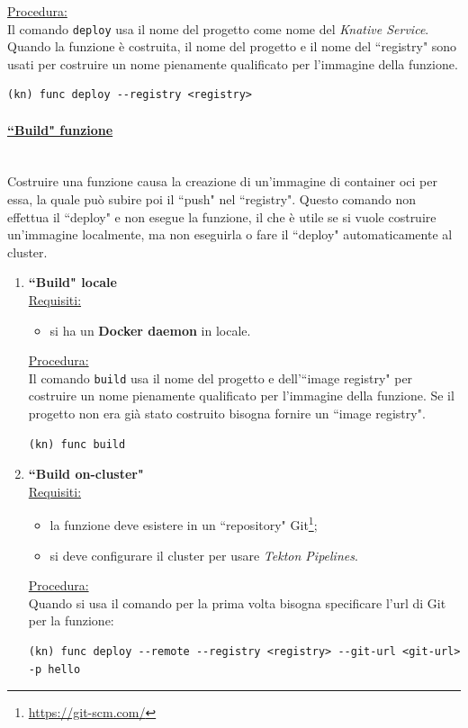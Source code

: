 \documentclass[12pt,a4paper,openany,twoside]{book}
\begin{document}
\noindent
\underline{Procedura:}
\\
Il comando \texttt{deploy} usa il nome del progetto come nome del \textit{Knative Service}. Quando la funzione è costruita, il nome del progetto e il nome del ``registry" sono usati per costruire un nome pienamente qualificato per l'immagine della funzione.
\begin{lstlisting}
(kn) func deploy --registry <registry>\end{lstlisting}


\paragraph{\underline{``Build" funzione}} ~\\
Costruire una funzione causa la creazione di un'immagine di container \ac{oci} per essa, la quale può subire poi il ``push" nel ``registry". Questo comando non effettua il ``deploy" e non esegue la funzione, il che è utile se si vuole costruire un'immagine localmente, ma non eseguirla o fare il ``deploy" automaticamente al cluster.

\begin{enumerate}
    \item \textbf{``Build" locale}
        \\
        \underline{Requisiti:}
        \begin{itemize}
            \item si ha un \textbf{Docker daemon} in locale.
        \end{itemize}

        \underline{Procedura:}
        \\
        Il comando \texttt{build} usa il nome del progetto e dell'``image registry" per costruire un nome pienamente qualificato per l'immagine della funzione. Se il progetto non era già stato costruito bisogna fornire un ``image registry".
        \begin{lstlisting}
(kn) func build\end{lstlisting}

    \item \textbf{``Build on-cluster"}
    \\
    \underline{Requisiti:}
        \begin{itemize}
            \item la funzione deve esistere in un ``repository" Git\footnote{\url{https://git-scm.com/}};
            
            \item si deve configurare il cluster per usare \textit{Tekton Pipelines}.
        \end{itemize}

        \underline{Procedura:}
        \\
        Quando si usa il comando per la prima volta bisogna specificare l'\ac{url} di Git per la funzione:
        \begin{lstlisting}
(kn) func deploy --remote --registry <registry> --git-url <git-url> -p hello\end{lstlisting}
\end{enumerate}
\end{document}
